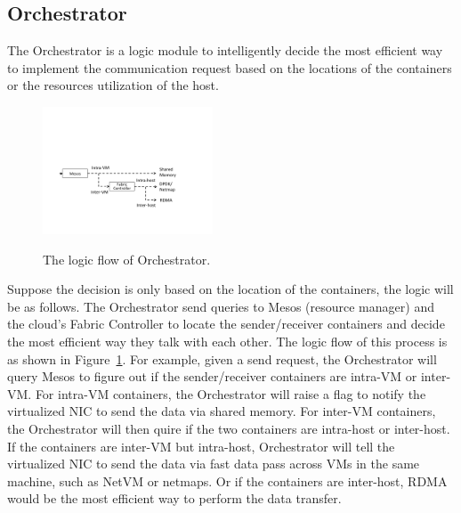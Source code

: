 \subsection{Orchestrator}
The Orchestrator is a logic module to intelligently decide the most
efficient way to implement the communication request based on the locations
of the containers or the resources utilization of the host.

     \begin{figure}[ht]
     \centering 
     \includegraphics[width=0.45\textwidth]{figures/system/system_locator.pdf}      
     \label{fig:system_locator}
     \caption{The logic flow of Orchestrator.} 
     \end{figure}

Suppose the decision is only based on the location of the containers, the logic will be as follows.
The Orchestrator send queries to Mesos (resource manager) and the cloud's Fabric Controller to locate
the sender/receiver containers and decide the most efficient way they talk with each other.
The logic flow of this process is as shown in Figure~\ref{fig:system_locator}.
For example, given a send request, the Orchestrator will query Mesos to figure out if the 
sender/receiver containers are intra-VM or inter-VM. 
For intra-VM containers, the Orchestrator will raise a flag to notify the virtualized NIC to
send the data via shared memory.
For inter-VM containers, the Orchestrator will then quire if the two containers are intra-host
or inter-host.
If the containers are inter-VM but intra-host, Orchestrator will tell the virtualized NIC to send
the data via fast data pass across VMs in the same machine, such as NetVM\cite{} or netmaps\cite{}.
Or if the containers are inter-host, RDMA would be the most efficient way to perform the data transfer.



